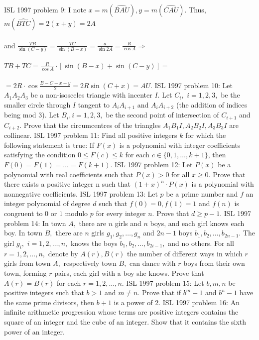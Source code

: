 ISL 1997 problem 9:  I note $x=m(\widehat {BAU}),y=m(\widehat {CAU})$. Thus, $m(\widehat {BTC})=2(x+y)=2A$ \\\\
and $\frac{TB}{\sin (C-y)}=\frac{TC}{\sin (B-x)}=\frac{a}{\sin 2A}=\frac{R}{\cos A}\Longrightarrow$ \\\\
$TB+TC=\frac{R}{\cos A}\cdot [\sin (B-x)+\sin (C-y)]=$ \\\\
$=2R\cdot \cos \frac{B-C-x+y}{2}=2R\sin (C+x)=AU.$ 
ISL 1997 problem 10:  Let $ A_1A_2A_3$ be a non-isosceles triangle with incenter $ I.$ Let $ C_i,$ $ i = 1, 2, 3,$ be the smaller circle through $ I$ tangent to $ A_iA_{i+1}$ and $ A_iA_{i+2}$ (the addition of indices being mod 3). Let $ B_i, i = 1, 2, 3,$ be the second point of intersection of $ C_{i+1}$ and $ C_{i+2}.$ Prove that the circumcentres of the triangles $ A_1 B_1I,A_2B_2I,A_3B_3I$ are collinear. 
ISL 1997 problem 11:  Find all positive integers $ k$ for which the following statement is true: If $ F(x)$ is a polynomial with integer coefficients satisfying the condition $ 0 \leq F(c) \leq k$ for each $ c\in \{0,1,\ldots,k + 1\}$, then  $ F(0) = F(1) = \ldots = F(k + 1)$. 
ISL 1997 problem 12:  Let $ P(x)$ be a polynomial with real coefficients such that $ P(x) > 0$ for all $ x \geq 0.$ Prove that there exists a positive integer n such that $ (1 + x)^n \cdot P(x)$ is a polynomial with nonnegative coefficients. 
ISL 1997 problem 13:  Let $ p$ be a prime number and $ f$ an integer polynomial of degree $ d$ such that $ f(0) = 0,f(1) = 1$ and $ f(n)$ is congruent to $ 0$ or $ 1$ modulo $ p$ for every integer $ n$. Prove that $ d\geq p - 1$. 
ISL 1997 problem 14:  In town $ A,$ there are $ n$ girls and $ n$ boys, and each girl knows each boy. In town $ B,$ there are $ n$ girls $ g_1, g_2, \ldots, g_n$ and $ 2n - 1$ boys $ b_1, b_2, \ldots, b_{2n-1}.$ The girl $ g_i,$ $ i = 1, 2, \ldots, n,$ knows the boys $ b_1, b_2, \ldots, b_{2i-1},$ and no others. For all $ r = 1, 2, \ldots, n,$ denote by $ A(r),B(r)$ the number of different ways in which $ r$ girls from town $ A,$ respectively town $ B,$ can dance with $ r$ boys from their own town, forming $ r$ pairs, each girl with a boy she knows. Prove that $ A(r) = B(r)$ for each $ r = 1, 2, \ldots, n.$ 
ISL 1997 problem 15:  Let $ b, m, n$ be positive integers such that $ b > 1$ and $ m \neq n.$ Prove that if $ b^m - 1$ and $ b^n - 1$ have the same prime divisors, then $ b + 1$ is a power of 2. 
ISL 1997 problem 16:  An infinite arithmetic progression whose terms are positive integers contains the square of an integer and the cube of an integer. Show that it contains the sixth power of an integer. 
